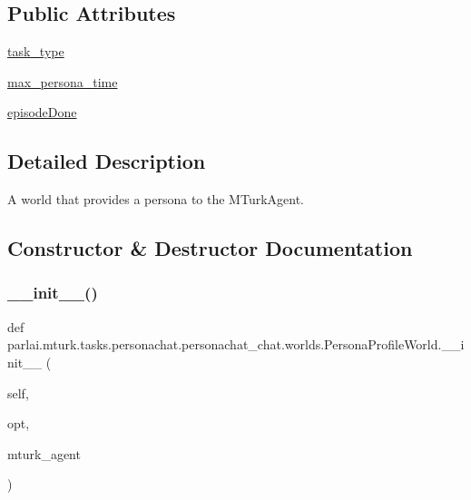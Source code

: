 \subsection*{Public Attributes}
\begin{DoxyCompactItemize}
\item 
\hyperlink{classparlai_1_1mturk_1_1tasks_1_1personachat_1_1personachat__chat_1_1worlds_1_1PersonaProfileWorld_a1f5c0449ba2b78995696e5d428ddc71a}{task\+\_\+type}
\item 
\hyperlink{classparlai_1_1mturk_1_1tasks_1_1personachat_1_1personachat__chat_1_1worlds_1_1PersonaProfileWorld_ab8a509dc9003c556658d8b07b4310803}{max\+\_\+persona\+\_\+time}
\item 
\hyperlink{classparlai_1_1mturk_1_1tasks_1_1personachat_1_1personachat__chat_1_1worlds_1_1PersonaProfileWorld_ae481c1bb5d65a01eba920cd88265e41b}{episode\+Done}
\end{DoxyCompactItemize}


\subsection{Detailed Description}
\begin{DoxyVerb}A world that provides a persona to the MTurkAgent.
\end{DoxyVerb}
 

\subsection{Constructor \& Destructor Documentation}
\mbox{\label{classparlai_1_1mturk_1_1tasks_1_1personachat_1_1personachat__chat_1_1worlds_1_1PersonaProfileWorld_a0d3decd1783860bca545ff69f49a8629}} 
\subsubsection{\texorpdfstring{\+\_\+\+\_\+init\+\_\+\+\_\+()}{\_\_init\_\_()}}
{\footnotesize\ttfamily def parlai.\+mturk.\+tasks.\+personachat.\+personachat\+\_\+chat.\+worlds.\+Persona\+Profile\+World.\+\_\+\+\_\+init\+\_\+\+\_\+ (\begin{DoxyParamCaption}\item[{}]{self,  }\item[{}]{opt,  }\item[{}]{mturk\+\_\+agent }\end{DoxyParamCaption})}



